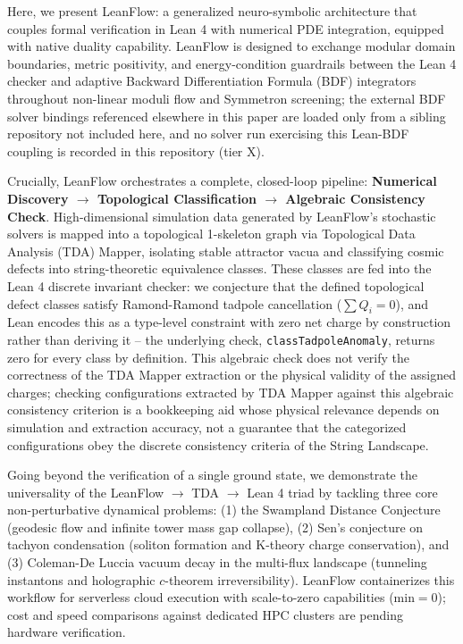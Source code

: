 \documentclass[11pt,a4paper]{article}
\begin{document}
Here, we present LeanFlow: a generalized neuro-symbolic architecture that couples formal verification in Lean 4 with numerical PDE integration, equipped with native duality capability. LeanFlow is designed to exchange modular domain boundaries, metric positivity, and energy-condition guardrails between the Lean 4 checker and adaptive Backward Differentiation Formula (BDF) integrators throughout non-linear moduli flow and Symmetron screening; the external BDF solver bindings referenced elsewhere in this paper are loaded only from a sibling repository not included here, and no solver run exercising this Lean-BDF coupling is recorded in this repository (tier X).

Crucially, LeanFlow orchestrates a complete, closed-loop pipeline: \textbf{Numerical Discovery $\to$ Topological Classification $\to$ Algebraic Consistency Check}. High-dimensional simulation data generated by LeanFlow's stochastic solvers is mapped into a topological 1-skeleton graph via Topological Data Analysis (TDA) Mapper, isolating stable attractor vacua and classifying cosmic defects into string-theoretic equivalence classes. These classes are fed into the Lean 4 discrete invariant checker: we conjecture that the defined topological defect classes satisfy Ramond-Ramond tadpole cancellation ($\sum Q_i = 0$), and Lean encodes this as a type-level constraint with zero net charge by construction rather than deriving it -- the underlying check, \texttt{classTadpoleAnomaly}, returns zero for every class by definition. This algebraic check does not verify the correctness of the TDA Mapper extraction or the physical validity of the assigned charges; checking configurations extracted by TDA Mapper against this algebraic consistency criterion is a bookkeeping aid whose physical relevance depends on simulation and extraction accuracy, not a guarantee that the categorized configurations obey the discrete consistency criteria of the String Landscape.

Going beyond the verification of a single ground state, we demonstrate the universality of the LeanFlow $\to$ TDA $\to$ Lean 4 triad by tackling three core non-perturbative dynamical problems: (1) the Swampland Distance Conjecture (geodesic flow and infinite tower mass gap collapse), (2) Sen's conjecture on tachyon condensation (soliton formation and K-theory charge conservation), and (3) Coleman-De Luccia vacuum decay in the multi-flux landscape (tunneling instantons and holographic $c$-theorem irreversibility). LeanFlow containerizes this workflow for serverless cloud execution with scale-to-zero capabilities ($\text{min}=0$); cost and speed comparisons against dedicated HPC clusters are pending hardware verification.
\end{document}

